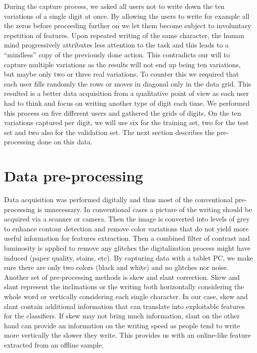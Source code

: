 \documentclass[a4paper]{article}
\begin{document}
{During the capture process, we asked all users not to write down the ten variations of a single digit at once. By allowing the users to write for example all the zeros before proceeding further on we let them become subject to involuntary repetition of features. Upon repeated writing of the same character, the human mind progressively attributes less attention to the task and this leads to a “mindless” copy of the previously done action. This contradicts our will to capture multiple variations as the results will not end up being ten variations, but maybe only two or three real variations. To counter this we required that each user fills randomly the rows or moves in diagonal only in the data grid. This resulted is a better data acquisition from a qualitative point of view as each user had to think and focus on writing another type of digit each time. We performed this process on five different users and gathered the grids of digits. On the ten variations captured per digit, we will use six for the training set, two for the test set and two also for the validation set. The next section describes the pre-processing done on this data.

\section{Data pre-processing}

Data acquisition was performed digitally and thus most of the conventional pre-processing is unnecessary. In conventional cases a picture of the writing should be acquired via a scanner or camera. Then the image is converted into levels of grey to enhance contour detection and remove color variations that do not yield more useful information for features extraction. Then a combined filter of contrast and luminosity is applied to remove any glitches the digitalization process might have induced (paper quality, stains, etc). By capturing data with a tablet PC, we make sure there are only two colors (black and white) and no glitches nor noise.\\

Another set of pre-processing methods is skew and slant correction. Skew and slant represent the inclinations or the writing both horizontally considering the whole word or vertically considering each single character. In our case, skew and slant contain additional information that can translate into exploitable features for the classifiers. If skew may not bring much information, slant on the other hand can provide an information on the writing speed as people tend to write more vertically the slower they write. This provides us with an online-like feature extracted from an offline sample.

}
\end{document}
